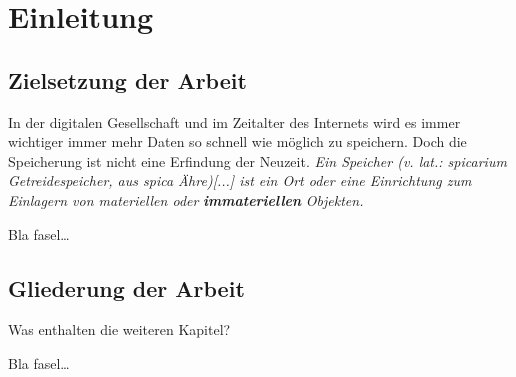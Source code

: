
\chapter{Einleitung}
\label{ch:Einleitung}




\section{Zielsetzung der Arbeit}
\label{ch:Einleitung:sec:Zielsetzung}

In der digitalen Gesellschaft und im Zeitalter des Internets wird es immer wichtiger immer mehr Daten so schnell wie möglich zu speichern. Doch die Speicherung ist nicht eine Erfindung der Neuzeit. \textit{Ein Speicher (v. lat.: spicarium Getreidespeicher, aus spica Ähre)[...] ist ein Ort oder eine Einrichtung zum Einlagern von materiellen oder} \textbf{\textit{immateriellen}} \textit{Objekten.}
\newline


Bla fasel\ldots

\section{Gliederung der Arbeit}
\label{ch:Einleitung:sec:Gliederung}

Was enthalten die weiteren Kapitel?

Bla fasel\ldots

